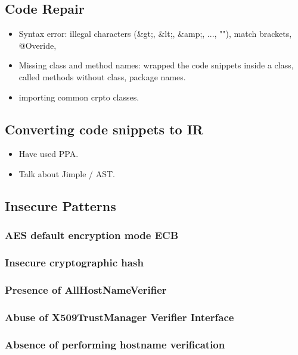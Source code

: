 \subsection{Code Repair}
\begin{itemize}
    \item Syntax error: illegal characters (\&gt;, \&lt;, \&amp;, ..., ""), match brackets, @Overide, 
    \item  Missing class and method names: wrapped the code snippets inside a class, called methods without class, package names.
    \item  importing common crpto classes. 
\end{itemize}
\subsection{Converting code snippets to IR}
\begin{itemize}
    \item Have used PPA. 
    \item Talk about Jimple / AST.
\end{itemize}
\subsection{Insecure Patterns}

\subsubsection{AES default encryption mode ECB }
\subsubsection{Insecure cryptographic hash}
\subsubsection{Presence of AllHostNameVerifier}
\subsubsection{Abuse of X509TrustManager Verifier Interface}
\subsubsection{Absence of performing hostname verification}
